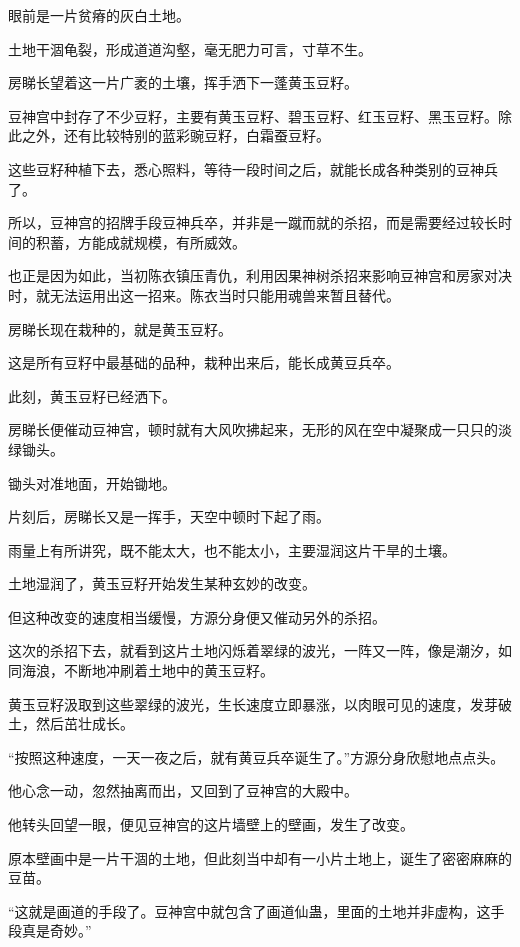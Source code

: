 
\begin{this_body}

眼前是一片贫瘠的灰白土地。

土地干涸龟裂，形成道道沟壑，毫无肥力可言，寸草不生。

房睇长望着这一片广袤的土壤，挥手洒下一蓬黄玉豆籽。

豆神宫中封存了不少豆籽，主要有黄玉豆籽、碧玉豆籽、红玉豆籽、黑玉豆籽。除此之外，还有比较特别的蓝彩豌豆籽，白霜蚕豆籽。

这些豆籽种植下去，悉心照料，等待一段时间之后，就能长成各种类别的豆神兵了。

所以，豆神宫的招牌手段豆神兵卒，并非是一蹴而就的杀招，而是需要经过较长时间的积蓄，方能成就规模，有所威效。

也正是因为如此，当初陈衣镇压青仇，利用因果神树杀招来影响豆神宫和房家对决时，就无法运用出这一招来。陈衣当时只能用魂兽来暂且替代。

房睇长现在栽种的，就是黄玉豆籽。

这是所有豆籽中最基础的品种，栽种出来后，能长成黄豆兵卒。

此刻，黄玉豆籽已经洒下。

房睇长便催动豆神宫，顿时就有大风吹拂起来，无形的风在空中凝聚成一只只的淡绿锄头。

锄头对准地面，开始锄地。

片刻后，房睇长又是一挥手，天空中顿时下起了雨。

雨量上有所讲究，既不能太大，也不能太小，主要湿润这片干旱的土壤。

土地湿润了，黄玉豆籽开始发生某种玄妙的改变。

但这种改变的速度相当缓慢，方源分身便又催动另外的杀招。

这次的杀招下去，就看到这片土地闪烁着翠绿的波光，一阵又一阵，像是潮汐，如同海浪，不断地冲刷着土地中的黄玉豆籽。

黄玉豆籽汲取到这些翠绿的波光，生长速度立即暴涨，以肉眼可见的速度，发芽破土，然后茁壮成长。

“按照这种速度，一天一夜之后，就有黄豆兵卒诞生了。”方源分身欣慰地点点头。

他心念一动，忽然抽离而出，又回到了豆神宫的大殿中。

他转头回望一眼，便见豆神宫的这片墙壁上的壁画，发生了改变。

原本壁画中是一片干涸的土地，但此刻当中却有一小片土地上，诞生了密密麻麻的豆苗。

“这就是画道的手段了。豆神宫中就包含了画道仙蛊，里面的土地并非虚构，这手段真是奇妙。”


\end{this_body}
